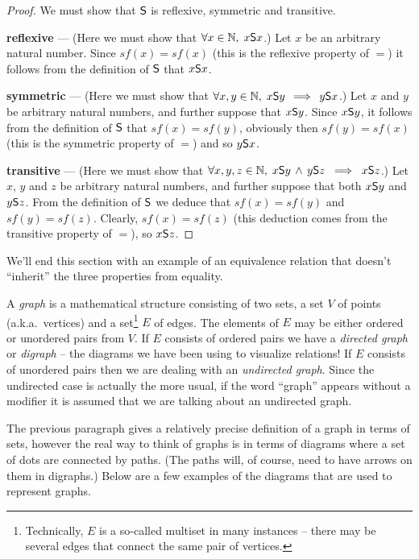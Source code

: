 \begin{proof}
We must show that $\mbox{\textsf S}$ is reflexive, symmetric and transitive.

{\bf reflexive} --- (Here we must show that $\forall x \in {\mathbb N}, \; x \mbox{\textsf S} x$.)
Let $x$ be an arbitrary natural number.  Since $sf(x) = sf(x)$ (this is the reflexive 
property of $=$) it follows from the definition of $\mbox{\textsf S}$ that $x \mbox{\textsf S} x$.

{\bf symmetric} --- (Here we must show that  $\forall x,y \in {\mathbb N}, \; x \mbox{\textsf S} y \, 
\implies \, y \mbox{\textsf S} x$.)
Let $x$ and $y$ be arbitrary natural numbers, and further suppose that $x \mbox{\textsf S} y$. 
Since $x \mbox{\textsf S} y$, it follows from the definition of $\mbox{\textsf S}$ that $sf(x) = sf(y)$,
obviously then $sf(y) = sf(x)$ (this is the symmetric property of $=$) and so 
$y \mbox{\textsf S} x$.

{\bf transitive} --- (Here we must show that  $\forall x,y,z \in {\mathbb N}, \; x \mbox{\textsf S} y \,
\land \, y \mbox{\textsf S} z \; \implies \; x \mbox{\textsf S} z$.)
Let $x$, $y$ and $z$ be arbitrary natural numbers, and further suppose that both 
$x \mbox{\textsf S} y$ and $y \mbox{\textsf S} z$.  From the definition of $\mbox{\textsf S}$ we deduce that 
$sf(x) = sf(y)$ and $sf(y) = sf(z)$.  Clearly, $sf(x) = sf(z)$ (this deduction comes
from the transitive property of $=$), so $x \mbox{\textsf S} z$.

\end{proof}
 
We'll end this section with an example of an equivalence relation that
doesn't ``inherit'' the three properties from equality.  

A  \emph{graph} is a mathematical structure consisting of
two sets, a set $V$ of points (a.k.a.\ vertices) and a set\footnote{Technically, $E$ is a so-called
multiset in many instances -- there may be several edges that connect the same pair of vertices.} $E$ of edges.
The elements of $E$ may be either ordered or unordered pairs from $V$. 
If $E$ consists of ordered pairs we have a  
\emph{directed graph} or \emph{digraph} -- the diagrams we have been using to visualize
relations!  If $E$ consists of unordered 
pairs then we are dealing with an \emph{undirected graph}.  Since the
undirected case is actually the more usual, if the word ``graph'' appears without
a modifier it is assumed that we are talking about an undirected graph.

The previous paragraph gives a relatively precise definition of a graph
in terms of sets, however the real way to think of graphs is in terms
of diagrams where a set of dots are connected by paths.  (The paths will, 
of course, need to
have arrows on them in digraphs.)  Below are a few examples of the 
diagrams that are used to represent graphs.

